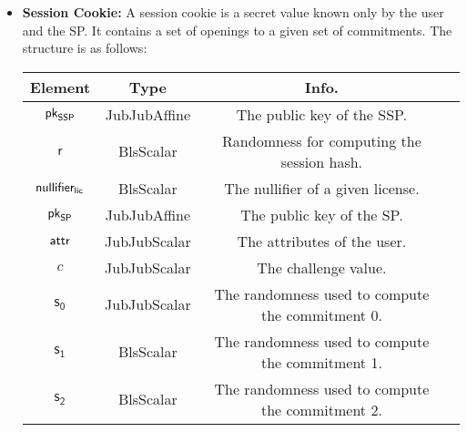 \begin{itemize}
    \item \textbf{Session Cookie:} A session cookie is a secret value known only by the user and the SP. It contains a set of openings to a given set of commitments. The structure is as follows:

    \begin{center}
        \begin{tabular}{ |c|c|c|c| } 
        \hline
        \textbf{Element} & \textbf{Type} & \textbf{Info.} \\
        \hline
        $\mathsf{pk}_{\mathsf{SSP}}$ & JubJubAffine & The public key of the SSP. \\
        $\mathsf{r}$ & BlsScalar & Randomness for computing the session hash. \\
        $\mathsf{nullifier_{lic}}$ & BlsScalar & The nullifier of a given license. \\ 
        $\mathsf{pk}_{\mathsf{SP}}$ & JubJubAffine & The public key of the SP. \\ 
        $\mathsf{attr}$ & JubJubScalar & The attributes of the user. \\ 
        $c$ & JubJubScalar & The challenge value. \\ 
        $\mathsf{s_0}$ & JubJubScalar & The randomness used to compute the commitment 0. \\
        $\mathsf{s_1}$ & BlsScalar & The randomness used to compute the commitment 1. \\
        $\mathsf{s_2}$ & BlsScalar & The randomness used to compute the commitment 2. \\
        \hline
        \end{tabular}
    \end{center}

\end{itemize}